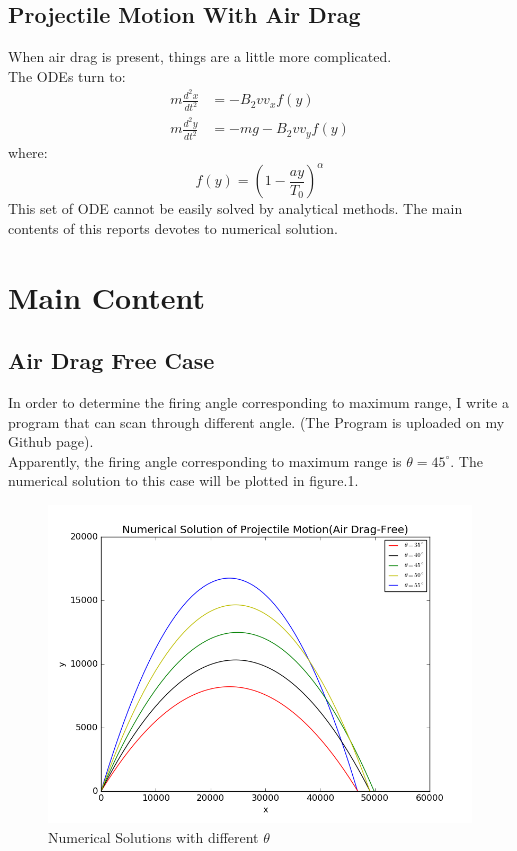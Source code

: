 \documentclass[10pt,a4paper]{article}
\begin{document}
	\subsection{Projectile Motion With Air Drag}
	When air drag is present, things are a little more complicated.\\
	The ODEs turn to:
	\begin{align}
	m\frac{d^{2}x}{dt^{2}}&=-B_{2}vv_{x}f(y)\\
	m\frac{d^{2}y}{dt^{2}}&=-mg-B_{2}vv_{y}f(y)
	\end{align}
    where:
    \begin{equation}
    f(y)=(1-\frac{ay}{T_0})^{\alpha}
    \end{equation}
    This set of ODE cannot be easily solved by analytical methods. The main contents of this reports devotes to numerical solution.
    \section{Main Content}
    \subsection{Air Drag Free Case}
    In order to determine the firing angle corresponding to maximum range, I write a program that can scan through different angle. (The Program is uploaded on my Github page).\\
    Apparently, the firing angle corresponding to maximum range is $\theta=45^\circ$.    
    The numerical solution to this case will be plotted in figure.1.
    \begin{figure}[htbp]
    	\centering
    	\includegraphics[width=5in]{Drag_Free.png}
    	\caption{Numerical Solutions with different $\theta$}
    \end{figure}
    
\end{document}
